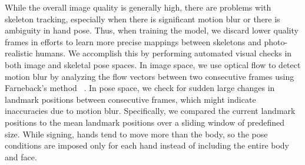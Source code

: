 While the overall image quality is generally high, there are problems with skeleton tracking, especially when there is significant motion blur or there is ambiguity in hand pose. 
Thus, when training the model, we discard lower quality frames
in efforts to learn more precise mappings between skeletons and photo-realistic humans.
We accomplish this by performing automated visual checks in both image and skeletal pose spaces. 
In image space, we use optical flow to detect motion blur by analyzing the flow vectors between two consecutive frames using Farneback's method ~\cite{farneback2003two}. 
In pose space, we check for sudden large changes in landmark positions between consecutive frames, which might indicate inaccuracies due to motion blur. 
Specifically, we compared the current landmark positions to the mean landmark positions over a sliding window of predefined size. While signing, hands tend to move more than the body, so the pose conditions are imposed only for each hand instead of including the entire body and face.



